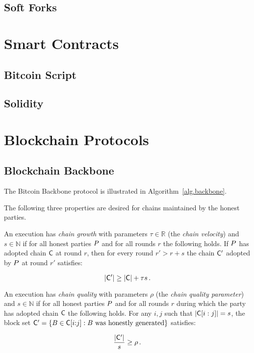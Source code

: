 \subsection{Soft Forks}

\section{Smart Contracts}
\subsection{Bitcoin Script}
\subsection{Solidity}


\section{Blockchain Protocols}

\subsection{Blockchain Backbone}

\cite{backbone,pass-asynchronous,varbackbone}

The Bitcoin Backbone protocol is illustrated in Algorithm~\ref{alg.backbone}.




The following three properties are desired for chains maintained by the honest
parties.

\begin{definition}
  An execution has \emph{chain growth} with parameters $\tau \in \mathbb{R}$
  (the \emph{chain velocity}) and $s \in \mathbb{N}$ if for all honest parties
  $P$ and for all rounds $r$ the following holds. If $P$ has adopted
  chain $\mathsf{C}$ at round $r$, then for every round $r' > r + s$ the chain
  $\mathsf{C}'$ adopted by $P$ at round $r'$ satisfies:

  \[
  |\mathsf{C}'| \geq |\mathsf{C}| + \tau s
  \,.
  \]
\end{definition}

\begin{definition}
  An execution has \emph{chain quality} with parameters $\rho$ (the
  \emph{chain quality parameter}) and $s \in \mathbb{N}$ if for all honest
  parties $P$ and for all rounds $r$ during which the party has adopted
  chain $\mathsf{C}$ the following holds. For any $i, j$ such that
  $|\mathsf{C}[i:j]| = s$,
  the block set
  $\mathsf{C}' = \{B \in \mathsf{C}[i{:}j]: B \text{ was honestly generated}\}$ satisfies:

  \[
  \frac{|\mathsf{C}'|}{s} \geq \rho
  \,.
  \]
\end{definition}

